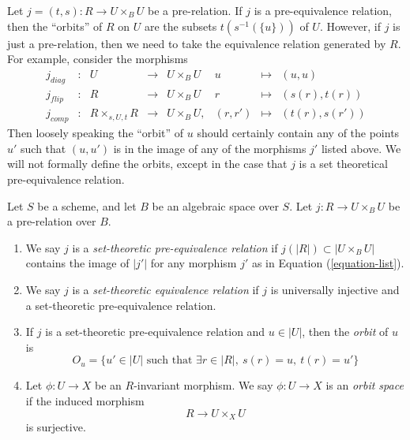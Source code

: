 \noindent
Let $j = (t, s) : R \to U \times_B U$ be a pre-relation.
If $j$ is a pre-equivalence relation, then the ``orbits'' of $R$ on $U$
are the subsets $t(s^{-1}(\{u\}))$ of $U$. However, if $j$ is just a
pre-relation, then we need to take the equivalence relation generated
by $R$. For example, consider the morphisms
\begin{equation}
\label{equation-list}
\begin{matrix}
j_{diag} &
: &
U &
\longrightarrow &
U \times_B U &
u &
\longmapsto &
(u, u) \\
j_{flip} &
: &
R &
\longrightarrow &
U \times_B U &
r &
\longmapsto &
(s(r), t(r)) \\
j_{comp} &
: &
R \times_{s, U, t} R &
\longrightarrow &
U \times_B U, &
(r, r') &
\longmapsto &
(t(r), s(r'))
\end{matrix}
\end{equation}
Then loosely speaking the ``orbit'' of $u$ should certainly contain any
of the points $u'$ such that $(u, u')$ is in the image of any
of the morphisms $j'$ listed above. We will not formally define the
orbits, except in the case that $j$ is a set theoretical pre-equivalence
relation.

\begin{definition}
\label{definition-orbits}
Let $S$ be a scheme, and let $B$ be an algebraic space over $S$.
Let $j : R \to U \times_B U$ be a pre-relation over $B$.
\begin{enumerate}
\item We say $j$ is a {\it set-theoretic pre-equivalence relation}
if $j(|R|) \subset |U \times_B U|$ contains the image of $|j'|$ for any
morphism $j'$ as in Equation (\ref{equation-list}).
\item We say $j$ is a {\it set-theoretic equivalence relation}
if $j$ is universally injective and a set-theoretic pre-equivalence
relation.
\item If $j$ is a set-theoretic pre-equivalence relation
and $u \in |U|$, then the {\it orbit} of $u$ is
$$
O_u =
\{u' \in |U| \text{ such that } \exists r \in |R|,\ s(r) = u,\ t(r) = u'\}
$$
\item Let $\phi : U \to X$ be an $R$-invariant morphism.
We say $\phi : U \to X$ is an {\it orbit space} if the induced morphism
$$
R \longrightarrow U \times_X U
$$
is surjective.
\end{enumerate}
\end{definition}

